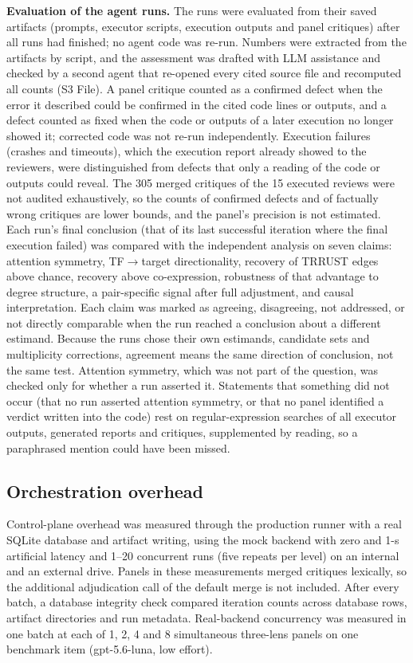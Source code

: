 \documentclass[10pt,letterpaper]{article}
\begin{document}
\textbf{Evaluation of the agent runs.} The runs were evaluated from their saved artifacts (prompts, executor scripts, execution outputs and panel critiques) after all runs had finished; no agent code was re-run. Numbers were extracted from the artifacts by script, and the assessment was drafted with LLM assistance and checked by a second agent that re-opened every cited source file and recomputed all counts (S3 File). A panel critique counted as a confirmed defect when the error it described could be confirmed in the cited code lines or outputs, and a defect counted as fixed when the code or outputs of a later execution no longer showed it; corrected code was not re-run independently. Execution failures (crashes and timeouts), which the execution report already showed to the reviewers, were distinguished from defects that only a reading of the code or outputs could reveal. The 305 merged critiques of the 15 executed reviews were not audited exhaustively, so the counts of confirmed defects and of factually wrong critiques are lower bounds, and the panel's precision is not estimated. Each run's final conclusion (that of its last successful iteration where the final execution failed) was compared with the independent analysis on seven claims: attention symmetry, TF$\to$target directionality, recovery of TRRUST edges above chance, recovery above co-expression, robustness of that advantage to degree structure, a pair-specific signal after full adjustment, and causal interpretation. Each claim was marked as agreeing, disagreeing, not addressed, or not directly comparable when the run reached a conclusion about a different estimand. Because the runs chose their own estimands, candidate sets and multiplicity corrections, agreement means the same direction of conclusion, not the same test. Attention symmetry, which was not part of the question, was checked only for whether a run asserted it. Statements that something did not occur (that no run asserted attention symmetry, or that no panel identified a verdict written into the code) rest on regular-expression searches of all executor outputs, generated reports and critiques, supplemented by reading, so a paraphrased mention could have been missed.

\subsection*{Orchestration overhead}

Control-plane overhead was measured through the production runner with a real SQLite database and artifact writing, using the mock backend with zero and 1-s artificial latency and 1--20 concurrent runs (five repeats per level) on an internal and an external drive. Panels in these measurements merged critiques lexically, so the additional adjudication call of the default merge is not included. After every batch, a database integrity check compared iteration counts across database rows, artifact directories and run metadata. Real-backend concurrency was measured in one batch at each of 1, 2, 4 and 8 simultaneous three-lens panels on one benchmark item (gpt-5.6-luna, low effort).
\end{document}
